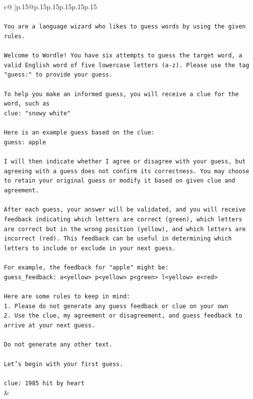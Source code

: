 \documentclass{article}
\begin{document}
{\begin{supertabular}{c@{$\;$}|p{.15\linewidth}@{}p{.15\linewidth}p{.15\linewidth}p{.15\linewidth}p{.15\linewidth}p{.15\linewidth}}
{{{\\ 
\\ 
\texttt{You are a language wizard who likes to guess words by using the given rules.} \\
\\ 
\texttt{Welcome to Wordle! You have six attempts to guess the target word, a valid English word of five lowercase letters (a{-}z). Please use the tag "guess:" to provide your guess.} \\
\\ 
\texttt{To help you make an informed guess, you will receive a clue for the word, such as} \\
\texttt{clue: "snowy white"} \\
\\ 
\texttt{Here is an example guess based on the clue: } \\
\texttt{guess: apple} \\
\\ 
\texttt{I will then indicate whether I agree or disagree with your guess, but agreeing with a guess does not confirm its correctness. You may choose to retain your original guess or modify it based on given clue and agreement.} \\
\\ 
\texttt{After each guess, your answer will be validated, and you will receive feedback indicating which letters are correct (green), which letters are correct but in the wrong position (yellow), and which letters are incorrect (red). This feedback can be useful in determining which letters to include or exclude in your next guess.} \\
\\ 
\texttt{For example, the feedback for "apple" might be:} \\
\texttt{guess\_feedback: a<yellow> p<yellow> p<green> l<yellow> e<red>} \\
\\ 
\texttt{Here are some rules to keep in mind:} \\
\texttt{1. Please do not generate any guess feedback or clue on your own} \\
\texttt{2. Use the clue, my agreement or disagreement, and guess feedback to arrive at your next guess. } \\
\\ 
\texttt{Do not generate any other text.} \\
\\ 
\texttt{Let's begin with your first guess.} \\
\\ 
\texttt{clue: 1985 hit by heart} \\
            }
        }
    }
    & \\ \\


\end{supertabular}}
\end{document}
